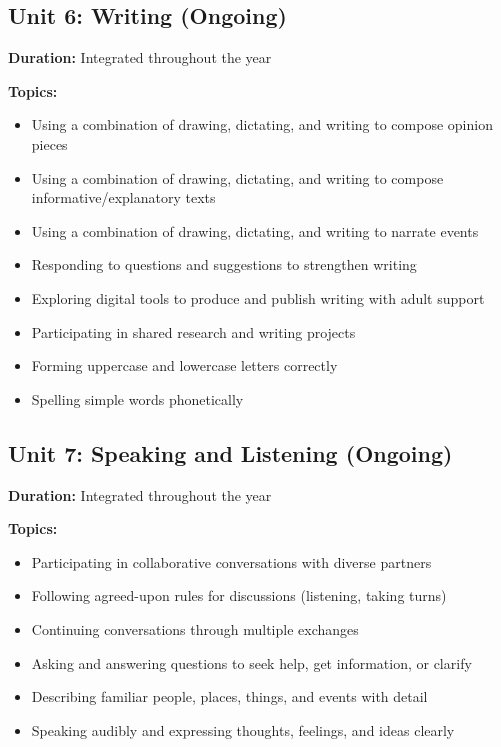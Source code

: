 \documentclass[11pt,letterpaper]{report}
\begin{document}
\subsection{Unit 6: Writing (Ongoing)}

\textbf{Duration:} Integrated throughout the year

\textbf{Topics:}
\begin{itemize}
    \item Using a combination of drawing, dictating, and writing to compose opinion pieces
    \item Using a combination of drawing, dictating, and writing to compose informative/explanatory texts
    \item Using a combination of drawing, dictating, and writing to narrate events
    \item Responding to questions and suggestions to strengthen writing
    \item Exploring digital tools to produce and publish writing with adult support
    \item Participating in shared research and writing projects
    \item Forming uppercase and lowercase letters correctly
    \item Spelling simple words phonetically
\end{itemize}

\subsection{Unit 7: Speaking and Listening (Ongoing)}

\textbf{Duration:} Integrated throughout the year

\textbf{Topics:}
\begin{itemize}
    \item Participating in collaborative conversations with diverse partners
    \item Following agreed-upon rules for discussions (listening, taking turns)
    \item Continuing conversations through multiple exchanges
    \item Asking and answering questions to seek help, get information, or clarify
    \item Describing familiar people, places, things, and events with detail
    \item Speaking audibly and expressing thoughts, feelings, and ideas clearly
\end{itemize}
\end{document}

